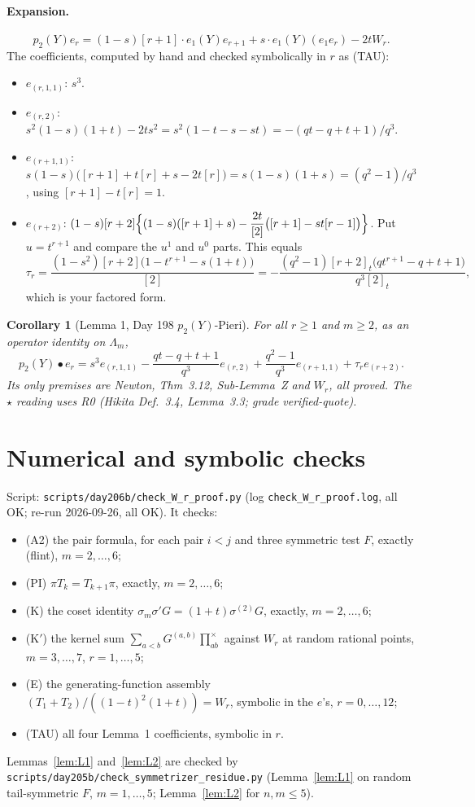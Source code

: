 \documentclass[11pt]{amsart}
\newtheorem{corollary}[theorem]{Corollary}
\theoremstyle{remark}
\newcommand{\tn}[1]{[#1]}
\newcommand{\cross}{\textstyle\prod^{\times}}
\begin{document}
\paragraph{Expansion.}
\[
p_2(Y)e_r = (1-s)\tn{r+1}\cdot e_1(Y)e_{r+1} + s\cdot e_1(Y)(e_1e_r) - 2tW_r.
\]
The coefficients, computed by hand and checked symbolically in $r$ as (TAU):
\begin{itemize}
\item $e_{(r,1,1)}$: $s^3$.
\item $e_{(r,2)}$: $s^2(1-s)(1+t) - 2ts^2 = s^2(1-t-s-st) = -(qt-q+t+1)/q^3$.
\item $e_{(r+1,1)}$: $s(1-s)\bigl(\tn{r+1}+t\tn{r}+s-2t\tn{r}\bigr) = s(1-s)(1+s) = (q^2-1)/q^3$, using $\tn{r+1}-t\tn{r} = 1$.
\item $e_{(r+2)}$: $(1-s)\tn{r+2}\Bigl\{(1-s)(\tn{r+1}+s) - \dfrac{2t}{\tn{2}}\bigl(\tn{r+1}-st\tn{r-1}\bigr)\Bigr\}$. Put $u = t^{r+1}$ and compare the $u^1$ and $u^0$ parts. This equals
\[
\tau_r = \frac{(1-s^2)\tn{r+2}\bigl(1-t^{r+1}-s(1+t)\bigr)}{\tn{2}} = -\frac{(q^2-1)\tn{r+2}_t\bigl(qt^{r+1}-q+t+1\bigr)}{q^3\tn{2}_t},
\]
which is your factored form.
\end{itemize}

\begin{corollary}[Lemma 1, Day 198 $p_2(Y)$-Pieri]
For all $r\ge1$ and $m\ge2$, as an operator identity on $\Lambda_m$,
\[
p_2(Y)\bullet e_r = s^3e_{(r,1,1)} - \frac{qt-q+t+1}{q^3}e_{(r,2)} + \frac{q^2-1}{q^3}e_{(r+1,1)} + \tau_re_{(r+2)}.
\]
Its only premises are Newton, Thm~3.12, Sub-Lemma~Z and $W_r$, all proved. The $\star$ reading uses R0 (Hikita Def.~3.4, Lemma~3.3; grade verified-quote).
\end{corollary}

\section{Numerical and symbolic checks}\label{sec:checks}

Script: \texttt{scripts/day206b/check\_W\_r\_proof.py} (log \texttt{check\_W\_r\_proof.log}, all OK; re-run 2026-09-26, all OK). It checks:
\begin{itemize}
\item (A2) the pair formula, for each pair $i<j$ and three symmetric test $F$, exactly (flint), $m=2,\dots,6$;
\item (PI) $\pi T_k = T_{k+1}\pi$, exactly, $m=2,\dots,6$;
\item (K) the coset identity $\sigma_m\sigma'G = (1+t)\sigma^{(2)}G$, exactly, $m=2,\dots,6$;
\item (K$'$) the kernel sum $\sum_{a<b}G^{(a,b)}\cross_{ab}$ against $W_r$ at random rational points, $m=3,\dots,7$, $r=1,\dots,5$;
\item (E) the generating-function assembly $(T_1+T_2)/((1-t)^2(1+t)) = W_r$, symbolic in the $e$'s, $r=0,\dots,12$;
\item (TAU) all four Lemma~1 coefficients, symbolic in $r$.
\end{itemize}
Lemmas~\ref{lem:L1} and~\ref{lem:L2} are checked by \texttt{scripts/day205b/check\_symmetrizer\_residue.py} (Lemma~\ref{lem:L1} on random tail-symmetric $F$, $m=1,\dots,5$; Lemma~\ref{lem:L2} for $n,m\le5$).
\end{document}
